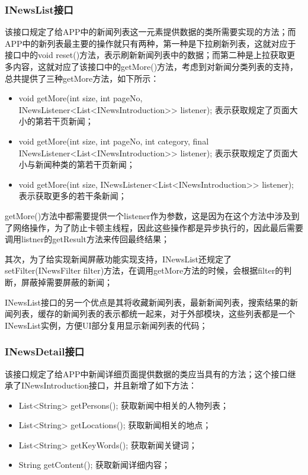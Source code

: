 \documentclass[UTF8]{ctexart}
\begin{document}
	\subsubsection{INewsList接口}
		该接口规定了给APP中的新闻列表这一元素提供数据的类所需要实现的方法；而APP中的新列表最主要的操作就只有两种，第一种是下拉刷新列表，这就对应于接口中的void reset()方法，表示刷新新闻列表中的数据；而第二种是上拉获取更多内容，这就对应了该接口中的getMore()方法，考虑到对新闻分类列表的支持，总共提供了三种getMore方法，如下所示：

		\begin{itemize}
			\item  void getMore(int size, int pageNo, INewsListener<List<INewsIntroduction>> listener); 表示获取规定了页面大小的第若干页新闻；
			\item void getMore(int size, int pageNo, int category, final INewsListener<List<INewsIntroduction>> listener); 表示获取规定了页面大小与新闻种类的第若干页新闻；
			\item  void getMore(int size, INewsListener<List<INewsIntroduction>> listener); 表示获取更多的若干条新闻；
		\end{itemize}

		getMore()方法中都需要提供一个listener作为参数，这是因为在这个方法中涉及到了网络操作，为了防止卡顿主线程，因此这些操作都是异步执行的，因此最后需要调用listner的getResult方法来传回最终结果；

		其次，为了给实现新闻屏蔽功能实现支持，INewsList还规定了setFilter(INewsFilter filter)方法，在调用getMore方法的时候，会根据filter的判断，屏蔽掉需要屏蔽的新闻；

		INewsList接口的另一个优点是其将收藏新闻列表，最新新闻列表，搜索结果的新闻列表，缓存的新闻列表的表示都统一起来，对于外部模块，这些列表都是一个INewsList实例，方便UI部分复用显示新闻列表的代码；

	\subsubsection{INewsDetail接口}
		该接口规定了给APP中新闻详细页面提供数据的类应当具有的方法；这个接口继承了INewsIntroduction接口，并且新增了如下方法：

		\begin{itemize}
			\item List<String> getPersons(); 获取新闻中相关的人物列表；
			\item List<String> getLocations(); 获取新闻相关的地点；
			\item List<String> getKeyWords(); 获取新闻关键词；
			\item String getContent(); 获取新闻详细内容；
		\end{itemize}
\end{document}
